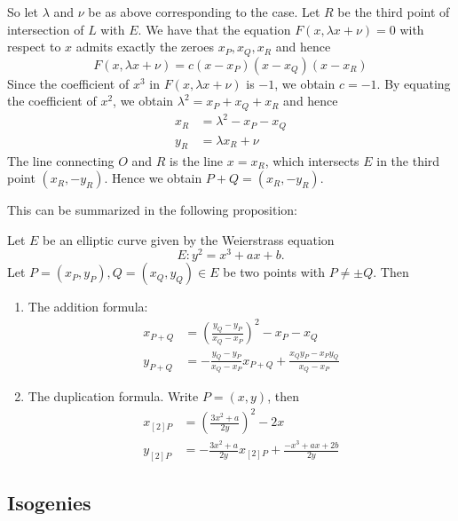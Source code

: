 So let $\lambda$ and $\nu$ be as above corresponding to the case.
Let $R$ be the third point of intersection of $L$ with $E$.
We have that the equation $F(x, \lambda x + \nu) = 0$ with respect to $x$
admits exactly the zeroes $x_P, x_Q, x_R$ and hence
\begin{equation*}
	F(x, \lambda x + \nu) = c(x - x_P)(x - x_Q)(x - x_R)
\end{equation*}
Since the coefficient of $x^3$ in $F(x, \lambda x + \nu)$ is $-1$, we obtain
$c = -1$. By equating the coefficient of $x^2$, we obtain
$\lambda^2 = x_P + x_Q + x_R$ and hence
\begin{align*}
	x_R &= \lambda^2 - x_P - x_Q\\
	y_R &= \lambda x_R + \nu
\end{align*}
The line connecting $O$ and $R$ is the line $x = x_R$, which intersects $E$
in the third point $(x_R, -y_R)$.
Hence we obtain $P + Q = (x_R, -y_R)$.

This can be summarized in the following proposition:
\begin{proposition}
	\label{prop:explicit-equations}
	Let $E$ be an elliptic curve given by the Weierstrass equation
	\begin{equation*}
		E: y^2 = x^3 + ax + b.
	\end{equation*}
	Let $P = (x_P, y_P), Q = (x_Q, y_Q) \in E$ be two points with $P \neq \pm Q$.
	Then 
	\begin{enumerate}
		\item The addition formula:
			\begin{align*}
				x_{P + Q} &= \left( \frac{y_Q - y_P}{x_Q - x_P} \right)^2
				- x_P - x_Q\\
				y_{P + Q} &= -\frac{y_Q - y_P}{x_Q - x_P}x_{P+Q} + \frac{x_Qy_P -
				x_Py_Q}{x_Q - x_P}
			\end{align*}
		\item The duplication formula. Write $P = (x, y)$, then
			\begin{align*}
				x_{[2]P} &= \left( \frac{3x^2 + a}{2y} \right)^2
				- 2x\\
				y_{[2]P} &= - \frac{3x^2 + a}{2y}x_{[2]P}
				+ \frac{-x^3 + ax + 2b}{2y}
			\end{align*}
	\end{enumerate}
\end{proposition}

\subsection{Isogenies}

